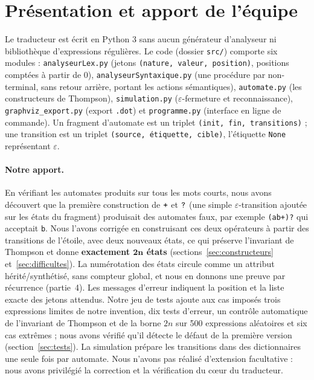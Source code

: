 \documentclass[12pt,a4paper]{article}
\newcommand{\code}[1]{{\fontsize{10}{12}\selectfont\texttt{#1}}}
\newcommand{\eps}{\ensuremath{\varepsilon}}
\newcommand{\tok}[1]{\ensuremath{\text{\fontsize{10}{12}\selectfont\ttfamily #1}}}
\begin{document}
\setcounter{page}{2}

\section*{Présentation et apport de l'équipe}

Le traducteur est écrit en Python 3 sans aucun générateur d'analyseur ni bibliothèque
d'expressions régulières. Le code (dossier \code{src/}) comporte six modules :
\code{analyseurLex.py} (jetons \code{(nature, valeur, position)}, positions comptées à partir de 0),
\code{analyseurSyntaxique.py} (une procédure par non-terminal, sans retour arrière, portant les
actions sémantiques), \code{automate.py} (les constructeurs de Thompson), \code{simulation.py}
(\eps-fermeture et reconnaissance), \code{graphviz\_export.py} (export \code{.dot}) et
\code{programme.py} (interface en ligne de commande). Un fragment d'automate est un triplet
\code{(init, fin, transitions)} ; une transition est un triplet \code{(source, étiquette, cible)},
l'étiquette \code{None} représentant \eps.

\paragraph{Notre apport.} En vérifiant les automates produits sur tous les mots courts, nous avons
découvert que la première construction de \tok{+} et \tok{?} (une simple \eps-transition ajoutée sur
les états du fragment) produisait des automates faux, par exemple \code{(ab+)?} qui acceptait
\code{b}. Nous l'avons corrigée en construisant ces deux opérateurs à partir des transitions de
l'étoile, avec deux nouveaux états, ce qui préserve l'invariant de Thompson et donne
\textbf{exactement $\boldsymbol{2n}$ états} (sections~\ref{sec:constructeurs}
et~\ref{sec:difficultes}). La numérotation des états circule comme un attribut hérité/synthétisé,
sans compteur global, et nous en donnons une preuve par récurrence (partie~4). Les messages
d'erreur indiquent la position et la liste exacte des jetons attendus. Notre jeu de tests ajoute
aux cas imposés trois expressions limites de notre invention, dix tests d'erreur, un contrôle
automatique de l'invariant de Thompson et de la borne $2n$ sur 500 expressions aléatoires et six cas
extrêmes ; nous avons vérifié qu'il détecte le défaut de la première version
(section~\ref{sec:tests}). La simulation prépare les transitions dans des dictionnaires une seule
fois par automate. Nous n'avons pas réalisé d'extension facultative : nous avons privilégié la
correction et la vérification du cœur du traducteur.
\end{document}
